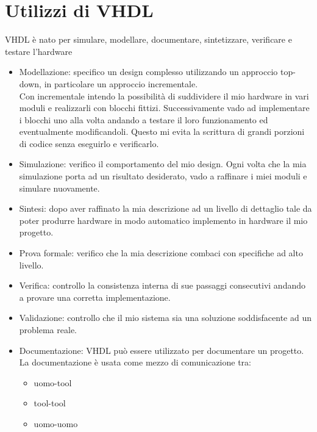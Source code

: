 \documentclass[10pt,a4paper,oneside]{scrbook}
\begin{document}
\section{Utilizzi di VHDL}
VHDL è nato per simulare, modellare, documentare, sintetizzare, verificare e testare l'hardware
\begin{itemize}
    \item Modellazione: specifico un design complesso utilizzando un approccio top-down, in particolare un approccio incrementale.\\
    Con incrementale intendo la possibilità di suddividere il mio hardware in vari moduli e realizzarli con blocchi fittizi. Successivamente vado ad implementare i blocchi uno alla volta andando a testare il loro funzionamento ed eventualmente modificandoli. Questo mi evita la scrittura di grandi porzioni di codice senza eseguirlo e verificarlo.
    \item Simulazione: verifico il comportamento del mio design. Ogni volta che la mia simulazione porta ad un risultato desiderato, vado a raffinare i miei moduli e simulare nuovamente.
    \item Sintesi: dopo aver raffinato la mia descrizione ad un livello di dettaglio tale da poter produrre hardware in modo automatico implemento in hardware il mio progetto.
    \item Prova formale: verifico che la mia descrizione combaci con specifiche ad alto livello.
    \item Verifica: controllo la consistenza interna di sue passaggi consecutivi andando a provare una corretta implementazione.
    \item Validazione: controllo che il mio sistema sia una soluzione soddisfacente ad un problema reale.
    \item Documentazione: VHDL può essere utilizzato per documentare un progetto. La documentazione è usata come mezzo di comunicazione tra:
    \begin{itemize}
        \item uomo-tool
        \item tool-tool
        \item uomo-uomo
    \end{itemize}
\end{itemize}
\end{document}
